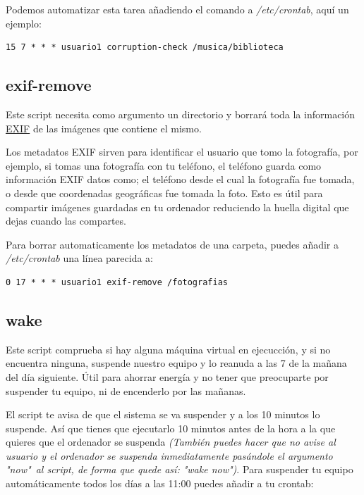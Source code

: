 \documentclass[12pt]{article}
\begin{document}
Podemos automatizar esta tarea añadiendo el comando a \emph{/etc/crontab}, aquí un ejemplo:

\begin{verbatim}
15 7 * * * usuario1 corruption-check /musica/biblioteca
\end{verbatim}

\subsection{exif-remove}

Este script necesita como argumento un directorio y borrará toda la información \href{https://en.wikipedia.org/wiki/Exif}{EXIF} de las imágenes que contiene el mismo.

Los metadatos EXIF sirven para identificar el usuario que tomo la fotografía, por ejemplo, si tomas una fotografía con tu teléfono, el teléfono guarda como información EXIF datos como; el teléfono desde el cual la fotografía fue tomada, o desde que coordenadas geográficas fue tomada la foto. Esto es útil para compartir imágenes guardadas en tu ordenador reduciendo la huella digital que dejas cuando las compartes.

Para borrar automaticamente los metadatos de una carpeta, puedes añadir a \emph{/etc/crontab} una línea parecida a:

\begin{verbatim}
0 17 * * * usuario1 exif-remove /fotografias
\end{verbatim}

\subsection{wake}

Este script comprueba si hay alguna máquina virtual en ejecucción, y si no encuentra ninguna, suspende nuestro equipo y lo reanuda a las 7 de la mañana del día siguiente. Útil para ahorrar energía y no tener que preocuparte por suspender tu equipo, ni de encenderlo por las mañanas.

El script te avisa de que el sistema se va suspender y a los 10 minutos lo suspende. Así que tienes que ejecutarlo 10 minutos antes de la hora a la que quieres que el ordenador se suspenda \emph{(También puedes hacer que no avise al usuario y el ordenador se suspenda inmediatamente pasándole el argumento "now"\ al script, de forma que quede así: "wake now")}. Para suspender tu equipo automáticamente todos los días a las 11:00 puedes añadir a tu crontab:
\end{document}
